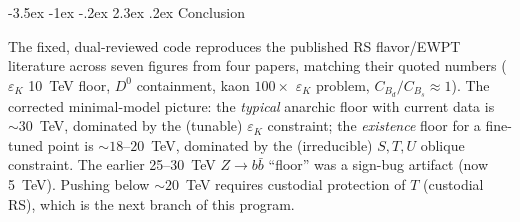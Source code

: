 \documentclass[11pt]{article}
\makeatletter
\renewcommand\section{\@startsection{section}{1}{\z@}%
  {-3.5ex \@plus -1ex \@minus -.2ex}%
  {2.3ex \@plus.2ex}%
  {\normalfont\Large\bfseries\color{accent}}}
\makeatother
\begin{document}
\section{Conclusion}

The fixed, dual-reviewed code reproduces the published RS flavor/EWPT literature
across seven figures from four papers, matching their quoted numbers
($\varepsilon_K$ 10~TeV floor, $D^0$ containment, kaon $100\times$ $\varepsilon_K$
problem, $C_{B_d}/C_{B_s}\approx1$). The corrected minimal-model picture: the
\emph{typical} anarchic floor with current data is ${\sim}30$~TeV, dominated by
the (tunable) $\varepsilon_K$ constraint; the \emph{existence} floor for a
fine-tuned point is ${\sim}18\text{--}20$~TeV, dominated by the (irreducible)
$S,T,U$ oblique constraint. The earlier 25--30~TeV $Z\to b\bar b$ ``floor'' was a
sign-bug artifact (now 5~TeV). Pushing below ${\sim}20$~TeV requires custodial
protection of $T$ (custodial RS), which is the next branch of this program.
\end{document}
